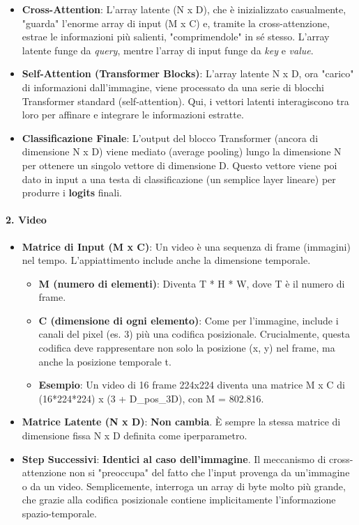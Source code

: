 \documentclass[
  11pt,
]{article}
\begin{document}
\begin{itemize}
\begin{itemize}
  \item
    \textbf{Cross-Attention}: L'array latente (N x D),
    che è inizializzato casualmente, "guarda" l'enorme
    array di input (M x C) e, tramite la cross-attenzione, estrae le
    informazioni più salienti, "comprimendole" in sé stesso.
    L'array latente funge da \emph{query}, mentre
    l'array di input funge da \emph{key} e \emph{value}.
  \item
    \textbf{Self-Attention (Transformer Blocks)}:
    L'array latente N x D, ora "carico" di informazioni
    dall'immagine, viene processato da una serie di
    blocchi Transformer standard (self-attention). Qui, i vettori
    latenti interagiscono tra loro per affinare e integrare le
    informazioni estratte.
  \item
    \textbf{Classificazione Finale}: L'output del blocco
    Transformer (ancora di dimensione N x D) viene mediato (average
    pooling) lungo la dimensione N per ottenere un singolo vettore di
    dimensione D. Questo vettore viene poi dato in input a una testa di
    classificazione (un semplice layer lineare) per produrre i
    \textbf{logits} finali.
  \end{itemize}
\end{itemize}

\paragraph{\texorpdfstring{\textbf{2. Video}}{2. Video}}\label{video}

\begin{itemize}
\item
  \textbf{Matrice di Input (M x C)}: Un video è una sequenza di frame
  (immagini) nel tempo. L'appiattimento include anche la
  dimensione temporale.

\begin{itemize}
  \item
    \textbf{M (numero di elementi)}: Diventa T * H * W, dove T è il
    numero di frame.
  \item
    \textbf{C (dimensione di ogni elemento)}: Come per
    l'immagine, include i canali del pixel (es. 3) più
    una codifica posizionale. Crucialmente, questa codifica deve
    rappresentare non solo la posizione (x, y) nel frame, ma anche la
    posizione temporale t.
  \item
    \textbf{Esempio}: Un video di 16 frame 224x224 diventa una matrice M
    x C di (16*224*224) x (3 + D\_pos\_3D), con M = 802.816.
  \end{itemize}
\item
  \textbf{Matrice Latente (N x D)}: \textbf{Non cambia}. È sempre la
  stessa matrice di dimensione fissa N x D definita come iperparametro.
\item
  \textbf{Step Successivi}: \textbf{Identici al caso
  dell'immagine}. Il meccanismo di cross-attenzione non
  si "preoccupa" del fatto che l'input provenga da
  un'immagine o da un video. Semplicemente, interroga un
  array di byte molto più grande, che grazie alla codifica posizionale
  contiene implicitamente l'informazione
  spazio-temporale.
\end{itemize}
\end{document}
